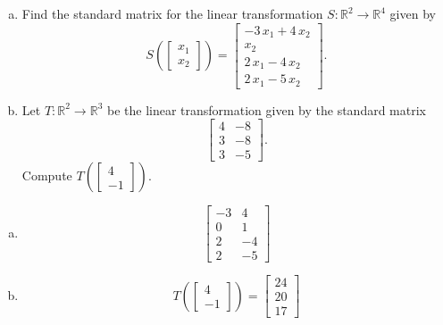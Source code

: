 
\begin{exerciseStatement}

\begin{enumerate}[(a)]
\item Find the standard matrix for the linear transformation \(S:\mathbb{R}^ 2  \to \mathbb{R}^ 4 \) given by \[S\left(  \left[\begin{array}{c}
x_{1} \\
x_{2}
\end{array}\right]  \right) =  \left[\begin{array}{c}
-3 \, x_{1} + 4 \, x_{2} \\
x_{2} \\
2 \, x_{1} - 4 \, x_{2} \\
2 \, x_{1} - 5 \, x_{2}
\end{array}\right] .\]
\item Let \(T:\mathbb{R}^ 2  \to \mathbb{R}^ 3 \) be the linear transformation given by the standard matrix \[ \left[\begin{array}{cc}
4 & -8 \\
3 & -8 \\
3 & -5
\end{array}\right] .\] Compute \(T\left( \left[\begin{array}{c}
4 \\
-1
\end{array}\right]  \right)\). 
\end{enumerate}
    
\end{exerciseStatement}
    
\begin{exerciseAnswer} 

\begin{enumerate}[(a)]
\item \[ \left[\begin{array}{cc}
-3 & 4 \\
0 & 1 \\
2 & -4 \\
2 & -5
\end{array}\right] \]
\item \[T\left( \left[\begin{array}{c}
4 \\
-1
\end{array}\right]  \right)= \left[\begin{array}{c}
24 \\
20 \\
17
\end{array}\right] \]
\end{enumerate}
    
\end{exerciseAnswer}
    
